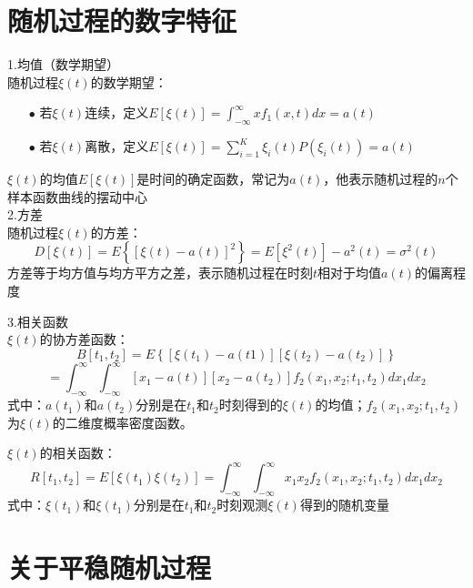 \documentclass[12pt,a4paper,oneside]{ctexart}
\begin{document}
\section{随机过程的数字特征}
1.均值（数学期望）\\
\indent 随机过程$\xi(t)$的数学期望：
    \begin{itemize}
        \item [$\bullet$] 若$\xi(t)$连续，定义$E[\xi(t)] = \int_{-\infty }^{\infty } xf_{1}(x,t)dx = a(t)$
        \item [$\bullet$] 若$\xi(t)$离散，定义$E[\xi(t)] =  {\textstyle \sum_{i=1}^{K}}\xi_{i}(t)P(\xi_{i}(t))=a(t)$ 
    \end{itemize}
\indent \indent $\xi (t)$的均值$E\left [ \xi(t) \right ] $是时间的确定函数，常记为$a(t)$，他表示随机过程的$n$个样本函数曲线的摆动中心\\

\indent 2.方差\\
\indent 随机过程$\xi(t)$的方差：
$$
D\left[\xi(t)\right] = E\left\{\left[\xi(t)-a(t)\right]^{2}\right\} = E[\xi^{2}(t)] - a^{2}(t) = \sigma^{2}(t)
$$
\indent 方差等于均方值与均方平方之差，表示随机过程在时刻$t$相对于均值$a(t)$的偏离程度

\indent 3.相关函数\\
\indent $\xi(t)$的协方差函数：
$$
B[t_{1},t_{2}] = E\left\{[\xi(t_{1}) - a(t1)][\xi(t_{2}) - a(t_{2})]\right\} 
$$
$$
= \int_{-\infty }^{\infty } \int_{-\infty}^{\infty}[x_{1} - a(t)][x_{2} - a(t_{2})]f_{2}(x_{1},x_{2};t_{1},t_{2})dx_{1}dx_{2}
$$
\indent 式中：$a(t_{1})$和$a(t_{2})$分别是在$t_{1}$和$t_{2}$时刻得到的$\xi(t)$的均值；$f_{2}(x_{1},x_{2};t_{1},t_{2})$为$\xi(t)$的二维度概率密度函数。

\indent $\xi(t)$的相关函数：
$$
R[t_{1},t_{2}] = E[\xi(t_{1})\xi(t_{2})] = \int_{-\infty}^{\infty}\int_{-\infty}^{\infty}x_{1}x_{2}f_{2}(x_{1},x_{2};t_{1},t_{2})dx_{1}dx_{2}
$$
\indent 式中：$\xi(t_{1})$和$\xi(t_{1})$分别是在$t_{1}$和$t_{2}$时刻观测$\xi(t)$得到的随机变量
\section{关于平稳随机过程}
\end{document}
